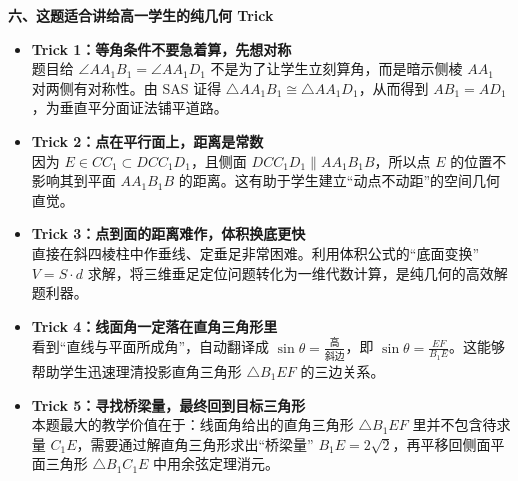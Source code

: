 {  \medskip
  \noindent\textbf{六、这题适合讲给高一学生的纯几何 Trick}\par
  \begin{itemize}[leftmargin=1.5em]
    \item \textbf{Trick 1：等角条件不要急着算，先想对称} \\
      题目给 $\angle AA_1B_1 = \angle AA_1D_1$ 不是为了让学生立刻算角，而是暗示侧棱 $AA_1$ 对两侧有对称性。由 SAS 证得 $\triangle AA_1B_1 \cong \triangle AA_1D_1$，从而得到 $AB_1 = AD_1$，为垂直平分面证法铺平道路。
    \item \textbf{Trick 2：点在平行面上，距离是常数} \\
      因为 $E \in CC_1 \subset DCC_1D_1$，且侧面 $DCC_1D_1 \parallel AA_1B_1B$，所以点 $E$ 的位置不影响其到平面 $AA_1B_1B$ 的距离。这有助于学生建立“动点不动距”的空间几何直觉。
    \item \textbf{Trick 3：点到面的距离难作，体积换底更快} \\
      直接在斜四棱柱中作垂线、定垂足非常困难。利用体积公式的“底面变换” $V = S \cdot d$ 求解，将三维垂足定位问题转化为一维代数计算，是纯几何的高效解题利器。
    \item \textbf{Trick 4：线面角一定落在直角三角形里} \\
      看到“直线与平面所成角”，自动翻译成 $\sin\theta = \frac{\text{高}}{\text{斜边}}$，即 $\sin\theta = \frac{EF}{B_1E}$。这能够帮助学生迅速理清投影直角三角形 $\triangle B_1EF$ 的三边关系。
    \item \textbf{Trick 5：寻找桥梁量，最终回到目标三角形} \\
      本题最大的教学价值在于：线面角给出的直角三角形 $\triangle B_1EF$ 里并不包含待求量 $C_1E$，需要通过解直角三角形求出“桥梁量” $B_1E = 2\sqrt{2}$，再平移回侧面平面三角形 $\triangle B_1C_1E$ 中用余弦定理消元。
  \end{itemize}
}

\newcommand{\qSolidShijiazhuangPrismDiagnosis}{%
  主要考查斜侧棱柱中利用性质对称性证明线线垂直、通过体积法利用等体积换底求点到平面距离、以及利用线面角直角三角形降维到侧面平面三角形中应用余弦定理列式求线段长度。
}

\newcommand{\qSolidShijiazhuangPrismTeachingNotes}{%
  \item \textbf{重难点提示}：
    \begin{itemize}
      \item 第一问：全等三角形是解题的切入点，利用 $AB_1 = AD_1$ 证明垂直平分面，避开传统的辅助面投影，更适合高一思维。
      \item 第二问：利用平行侧棱性质和四棱柱体积公式进行“体积换底”，是解答点面距离的绝对利器。
      \item 第三问：结合线面角正弦关系解出 $B_1E$，最后降维到平面 $\triangle B_1C_1E$ 的余弦定理，是几何法与平面几何无缝融合的典范。
      \item \textbf{真题版本勘误说明}：部分试卷或练习册中由于排版疏忽，常将条件误印为 $AA_1 = AC = AB = 2$（漏掉了 $AC_1$ 的下角标 $1$）。在教学中需提醒学生：若为 $AC = 2$，在底面为菱形且 $AB = 2, \angle BAD = 60^\circ$ 的情况下，对角线 $AC$ 理论上必须为 $2\sqrt{3}$，设为 $2$ 会产生几何矛盾；且没有 $AC_1$ 的长度限制，斜棱柱的倾斜角度（高度）将无法确定。因此，正确的自洽条件应为 $AC_1 = 2$。
    \end{itemize}
}
